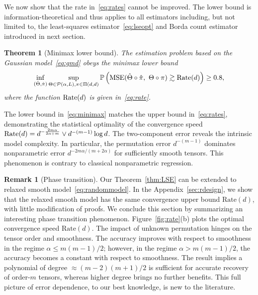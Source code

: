 \documentclass[12pt]{article}
\newtheorem{thm}{Theorem}
\theoremstyle{definition}
\newtheorem{rmk}{Remark}
\begin{document}
We now show that the rate in~\eqref{eq:rates} cannot be improved. The lower bound is information-theoretical and thus applies to all estimators including, but not limited to, the least-squares estimator~\eqref{eq:lseopt} and Borda count estimator introduced in next section. 
\begin{thm}[Minimax lower bound]\label{thm:minimax}The estimation problem based on the Gaussian model~\eqref{eq:gmd} obeys the minimax lower bound 
\begin{equation}\label{eq:minimax}
\inf_{(\hat \Theta,\hat \pi)}\sup_{
\Theta\in \mathcal{P}(\alpha,L), \pi\in \Pi(d,d)} \mathbb{P}\left(\textup{MSE}(\hat\Theta\circ\hat\pi,\ \Theta\circ\pi) \gtrsim \textup{Rate}(d) \right) \geq 0.8,
\end{equation}
where the function $\textup{Rate}(d)$ is given in~\eqref{eq:rate}.
\end{thm}
The lower bound in~\eqref{eq:minimax} matches the upper bound in~\eqref{eq:rates}, demonstrating the statistical optimality of  the convergence speed $\text{Rate}(d)=d^{-{2m\alpha  \over 2\alpha+m}}\vee d^{-(m-1)}\log d$. The two-component error reveals the intrinsic model complexity. In particular, the permutation error $d^{-(m-1)}$ dominates nonparametric error $d^{-{2m\alpha/(m+2\alpha)}}$ for sufficiently smooth tensors. This phenomenon is contrary to classical nonparametric regression. 

\begin{rmk}[Phase transition]\label{rmk:phase} {\color{blue}Our Theorem~\ref{thm:LSE} can be extended to relaxed smooth model~\eqref{eq:randommodel}. In the Appendix~\ref{sec:rdesign}, we show that the relaxed smooth model has the same convergence upper bound $\text{Rate}(d)$, with little modification of proofs.} We conclude this section by summarizing an interesting phase transition phenomenon.  Figure~\ref{fig:rate}(b) plots the optimal convergence speed $\text{Rate}(d)$. The impact of unknown permutation hinges on the tensor order and smoothness. The accuracy improves with respect to smoothness in the regime $\alpha\leq m(m-1)/2$; however, in the regime $\alpha>m(m-1)/2$, the accuracy becomes a constant with respect to smoothness.  
The result implies a polynomial of degree $\approx (m-2)(m+1)/2$ is sufficient for accurate recovery of order-$m$ tensors, whereas higher degree brings no further benefits. This full picture of error dependence, to our best knowledge, is new to the literature. 
\end{rmk}

\vspace{-.7cm}
\end{document}
